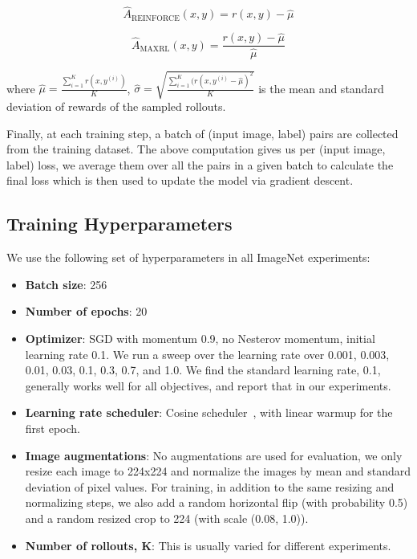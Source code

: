 \documentclass[10pt]{article} %
\begin{document}
\begin{equation*}
    \hat{A}_{\text{REINFORCE}}(x, y) = r(x, y) - \hat{\mu}
\end{equation*}

\begin{equation*}
    \hat{A}_{\text{MAXRL}}(x, y) = \frac{r(x, y) - \hat{\mu}}{\hat{\mu}}
\end{equation*}

where $\hat{\mu} = \frac{\sum_{i = 1}^K r(x, y^{(i)})}{K}$, $\hat{\sigma} = \sqrt{\frac{\sum_{i = 1}^K (r(x, y^{(i)} - \hat{\mu})^2}{K}}$ is the mean and standard deviation of rewards of the sampled rollouts.

Finally, at each training step, a batch of (input image, label) pairs are collected from the training dataset. The above computation gives us per (input image, label) loss, we average them over all the pairs in a given batch to calculate the final loss which is then used to update the model via gradient descent.


\subsection{Training Hyperparameters}

We use the following set of hyperparameters in all ImageNet experiments:

\begin{itemize}
    \item \textbf{Batch size}: 256
    \item \textbf{Number of epochs}: 20
    \item \textbf{Optimizer}: SGD with momentum 0.9, no Nesterov momentum, initial learning rate 0.1. We run a sweep over the learning rate over 0.001, 0.003, 0.01, 0.03, 0.1, 0.3, 0.7, and 1.0. We find the standard learning rate, 0.1, generally works well for all objectives, and report that in our experiments.
    \item \textbf{Learning rate scheduler}: Cosine scheduler~\citep{loshchilov2017sgdrstochasticgradientdescent}, with linear warmup for the first epoch.
    \item \textbf{Image augmentations}: No augmentations are used for evaluation, we only resize each image to 224x224 and normalize the images by mean and standard deviation of pixel values. For training, in addition to the same resizing and normalizing steps, we also add a random horizontal flip (with probability 0.5) and a random resized crop to 224 (with scale (0.08, 1.0)). 
    \item \textbf{Number of rollouts, K}: This is usually varied for different experiments.
\end{itemize}
\end{document}
